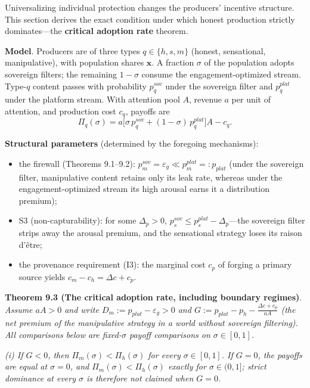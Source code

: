 \documentclass[
  11pt]{article}
\providecommand{\tightlist}{%
  \setlength{\itemsep}{0pt}\setlength{\parskip}{0pt}}
\begin{document}
Universalizing individual protection changes the producers' incentive
structure. This section derives the exact condition under which honest
production strictly dominates---the \textbf{critical adoption rate}
theorem.

\textbf{Model}. Producers are of three types \(q \in \{h, s, m\}\)
(honest, sensational, manipulative), with population shares
\(\mathbf{x}\). A fraction \(\sigma\) of the population adopts sovereign
filters; the remaining \(1-\sigma\) consume the engagement-optimized
stream. Type-\(q\) content passes with probability \(p_q^{sov}\) under
the sovereign filter and \(p_q^{plat}\) under the platform stream. With
attention pool \(A\), revenue \(a\) per unit of attention, and
production cost \(c_q\), payoffs are
\[\Pi_q(\sigma) = a\big[\sigma\, p_q^{sov} + (1-\sigma)\, p_q^{plat}\big] A - c_q.\]

\textbf{Structural parameters} (determined by the foregoing mechanisms):

\begin{itemize}
\tightlist
\item
  the firewall (Theorems 9.1--9.2):
  \(p_m^{sov} = \varepsilon_g \ll p_m^{plat} =: p_{plat}\) (under the
  sovereign filter, manipulative content retains only its leak rate,
  whereas under the engagement-optimized stream its high arousal earns
  it a distribution premium);
\item
  S3 (non-capturability): for some \(\Delta_p>0\),
  \(p_s^{sov} \le p_s^{plat} - \Delta_p\)---the sovereign filter strips
  away the arousal premium, and the sensational strategy loses its
  raison d'être;
\item
  the provenance requirement (I3): the marginal cost \(c_p\) of forging
  a primary source yields \(c_m - c_h = \Delta c + c_p\).
\end{itemize}

\textbf{Theorem 9.3 (The critical adoption rate, including boundary
regimes)}. \emph{Assume \(aA>0\) and write
\(D_m:=p_{plat}-\varepsilon_g>0\) and
\(G := p_{plat} - p_h - \frac{\Delta c + c_p}{aA}\) (the net premium of
the manipulative strategy in a world without sovereign filtering). All
comparisons below are fixed-\(\sigma\) payoff comparisons on
\(\sigma\in[0,1]\).}

\emph{(i) If \(G<0\), then \(\Pi_m(\sigma)<\Pi_h(\sigma)\) for every
\(\sigma\in[0,1]\). If \(G=0\), the payoffs are equal at \(\sigma=0\),
and \(\Pi_m(\sigma)<\Pi_h(\sigma)\) exactly for \(\sigma\in(0,1]\);
strict dominance at every \(\sigma\) is therefore not claimed when
\(G=0\).}
\end{document}
